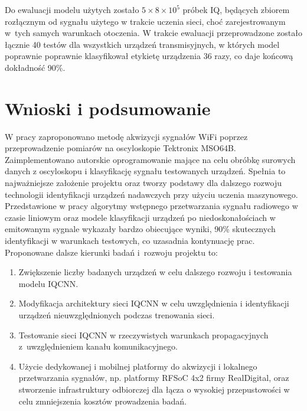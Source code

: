 
Do ewaluacji modelu użytych zostało $5\times8\times10^{5}$ próbek IQ, będących zbiorem rozłącznym od sygnału użytego w trakcie uczenia sieci, choć zarejestrowanym w~tych samych warunkach otoczenia. W trakcie ewaluacji przeprowadzone zostało łącznie 40 testów dla wszystkich urządzeń transmisyjnych, w których model poprawnie poprawnie klasyfikował etykietę urządzenia 36 razy, co daje końcową dokładność 90\%.

\section{Wnioski i podsumowanie}

W pracy zaproponowano metodę akwizycji sygnałów WiFi poprzez przeprowadzenie pomiarów na oscyloskopie Tektronix MSO64B. Zaimplementowano autorskie oprogramowanie mające na celu obróbkę surowych danych z oscyloskopu i klasyfikację sygnału testowanych urządzeń. Spełnia to najważniejsze założenie projektu oraz tworzy podstawy dla dalszego rozwoju technologii identyfikacji urządzeń nadawczych przy użyciu uczenia maszynowego. Przedstawione w pracy algorytmy wstępnego przetwarzania sygnału radiowego w czasie liniowym oraz modele klasyfikacji urządzeń po niedoskonałościach w emitowanym sygnale wykazały bardzo obiecujące wyniki,  90\% skutecznych identyfikacji w warunkach testowych, co uzasadnia kontynuację prac.
%
Proponowane dalsze kierunki badań i~rozwoju projektu to:
\begin{enumerate}   
    \item Zwiększenie liczby badanych urządzeń w celu dalszego rozwoju i testowania modelu IQCNN.
    \item Modyfikacja architektury sieci IQCNN w celu uwzględnienia i identyfikacji urządzeń nieuwzględnionych podczas trenowania sieci.
    \item Testowanie sieci IQCNN w rzeczywistych warunkach propagacyjnych z~uwzględnieniem kanału komunikacyjnego.
    \item Użycie dedykowanej i mobilnej platformy do akwizycji i lokalnego przetwarzania sygnałów, np. platformy RFSoC 4x2 firmy RealDigital,  oraz stworzenie infrastruktury odbiorczej dla łącza o wysokiej przepustowości w celu zmniejszenia kosztów prowadzenia badań.
\end{enumerate}

